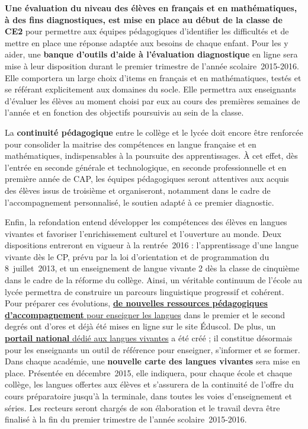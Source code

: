 \textbf{Une évaluation du niveau des élèves en français et en mathématiques, à des fins diagnostiques, est mise en place au début de la classe de CE2} pour permettre aux équipes pédagogiques d’identifier les difficultés et de mettre en place une réponse adaptée aux besoins de chaque enfant. Pour les y aider, une \textbf{banque d’outils d’aide à l’évaluation diagnostique} en ligne sera mise à leur disposition durant le premier trimestre de l’année scolaire~2015-2016. Elle comportera un large choix d’items en français et en mathématiques, testés et se référant explicitement aux domaines du socle. Elle permettra aux enseignants d’évaluer les élèves au moment choisi par eux au cours des premières semaines de l’année et en fonction des objectifs poursuivis au sein de la classe.

La \textbf{continuité pédagogique} entre le collège et le lycée doit encore être renforcée pour consolider la maitrise des compétences en langue française et en mathématiques, indispensables à la poursuite des apprentissages. À cet effet, dès l’entrée en seconde générale et technologique, en seconde professionnelle et en première année de CAP, les équipes pédagogiques seront attentives aux acquis des élèves issus de troisième et organiseront, notamment dans le cadre de l’accompagnement personnalisé, le soutien adapté à ce premier diagnostic.

Enfin, la refondation entend développer les compétences des élèves en langues vivantes et favoriser l’enrichissement culturel et l’ouverture au monde. Deux dispositions entreront en vigueur à la rentrée~2016 : l’apprentissage d’une langue vivante dès le CP, prévu par la loi d’orientation et de programmation du 8~juillet~2013, et un enseignement de langue vivante 2 dès la classe de cinquième dans le cadre de la réforme du collège. Ainsi, un véritable continuum de l’école au lycée permettra de construire un parcours linguistique progressif et cohérent. Pour préparer ces évolutions, \href{http://eduscol.education.fr/pid31432/enseigner-les-langues-vivantes.html}{\textbf{de nouvelles ressources pédagogiques d’accompagnement} pour enseigner les langues} dans le premier et le second degrés ont d’ores et déjà été mises en ligne sur le site Éduscol. De plus, un \href{http://eduscol.education.fr/langues-vivantes/}{\textbf{portail national} dédié aux langues vivantes} a été créé ; il constitue désormais pour les enseignants un outil de référence pour enseigner, s’informer et se former. Dans chaque académie, une \textbf{nouvelle carte des langues vivantes} sera mise en place. Présentée en décembre~2015, elle indiquera, pour chaque école et chaque collège, les langues offertes aux élèves et s’assurera de la continuité de l’offre du cours préparatoire jusqu’à la terminale, dans toutes les voies d’enseignement et séries. Les recteurs seront chargés de son élaboration et le travail devra être finalisé à la fin du premier trimestre de l’année scolaire~2015-2016.

